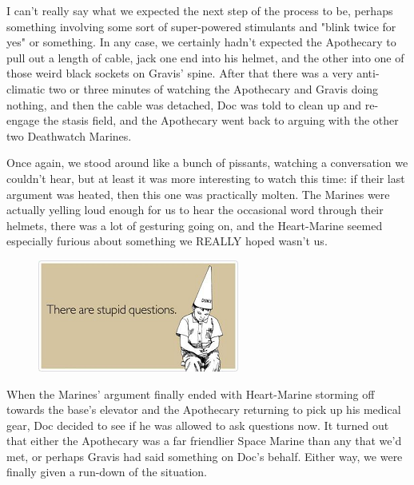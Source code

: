 I can't really say what we expected the next step of the process to be, perhaps something involving some sort of super-powered stimulants and "blink twice for yes" or something. 
In any case, we certainly hadn't expected the Apothecary to pull out a length of cable, jack one end into his helmet, and the other into one of those weird black sockets on Gravis' spine. 
After that there was a very anti-climatic two or three minutes of watching the Apothecary and Gravis doing nothing, and then the cable was detached, Doc was told to clean up and re-engage the stasis field, and the Apothecary went back to arguing with the other two Deathwatch Marines.

Once again, we stood around like a bunch of pissants, watching a conversation we couldn't hear, but at least it was more interesting to watch this time: 
if their last argument was heated, then this one was practically molten. 
The Marines were actually yelling loud enough for us to hear the occasional word through their helmets, there was a lot of gesturing going on, and the Heart-Marine seemed especially furious about something we REALLY hoped wasn't us.

\begin{figure}
	\begin{center}
		\includegraphics[width=\figwidth]{pics/16/14.png}
	\end{center}
\end{figure}
When the Marines' argument finally ended with Heart-Marine storming off towards the base's elevator and the Apothecary returning to pick up his medical gear, Doc decided to see if he was allowed to ask questions now. 
It turned out that either the Apothecary was a far friendlier Space Marine than any that we'd met, or perhaps Gravis had said something on Doc's behalf. 
Either way, we were finally given a run-down of the situation.




